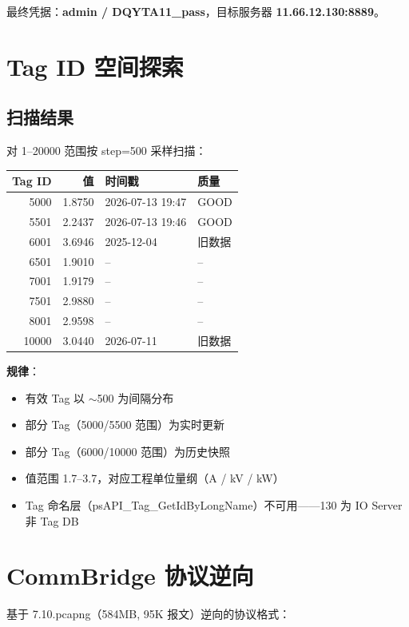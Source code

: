 \documentclass[12pt,a4paper]{ctexart}
\begin{document}
最终凭据：\textbf{admin / DQYTA11\_pass}，目标服务器 \textbf{11.66.12.130:8889}。

\section{Tag ID 空间探索}

\subsection{扫描结果}
对 1--20000 范围按 step=500 采样扫描：
\begin{table}[H]\centering
\begin{tabular}{rrll}
\toprule
\textbf{Tag ID} & \textbf{值} & \textbf{时间戳} & \textbf{质量} \\
\midrule
5000 & 1.8750 & 2026-07-13 19:47 & GOOD \\
5501 & 2.2437 & 2026-07-13 19:46 & GOOD \\
6001 & 3.6946 & 2025-12-04 & 旧数据 \\
6501 & 1.9010 & -- & -- \\
7001 & 1.9179 & -- & -- \\
7501 & 2.9880 & -- & -- \\
8001 & 2.9598 & -- & -- \\
10000 & 3.0440 & 2026-07-11 & 旧数据 \\
\bottomrule
\end{tabular}
\end{table}

\textbf{规律}：
\begin{itemize}[leftmargin=*]
  \item 有效 Tag 以 $\sim$500 为间隔分布
  \item 部分 Tag（5000/5500 范围）为实时更新
  \item 部分 Tag（6000/10000 范围）为历史快照
  \item 值范围 1.7--3.7，对应工程单位量纲（A / kV / kW）
  \item Tag 命名层（psAPI\_Tag\_GetIdByLongName）不可用——130 为 IO Server 非 Tag DB
\end{itemize}

\section{CommBridge 协议逆向}

基于 7.10.pcapng（584MB, 95K 报文）逆向的协议格式：
\end{document}
